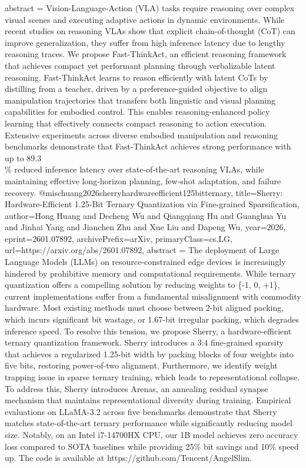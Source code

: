 {      abstract = {Vision-Language-Action (VLA) tasks require reasoning over complex visual scenes and executing adaptive actions in dynamic environments. While recent studies on reasoning VLAs show that explicit chain-of-thought (CoT) can improve generalization, they suffer from high inference latency due to lengthy reasoning traces. We propose Fast-ThinkAct, an efficient reasoning framework that achieves compact yet performant planning through verbalizable latent reasoning. Fast-ThinkAct learns to reason efficiently with latent CoTs by distilling from a teacher, driven by a preference-guided objective to align manipulation trajectories that transfers both linguistic and visual planning capabilities for embodied control. This enables reasoning-enhanced policy learning that effectively connects compact reasoning to action execution. Extensive experiments across diverse embodied manipulation and reasoning benchmarks demonstrate that Fast-ThinkAct achieves strong performance with up to 89.3\\\% reduced inference latency over state-of-the-art reasoning VLAs, while maintaining effective long-horizon planning, few-shot adaptation, and failure recovery.}
}@misc{huang2026sherryhardwareefficient125bitternary,
      title={Sherry: Hardware-Efficient 1.25-Bit Ternary Quantization via Fine-grained Sparsification}, 
      author={Hong Huang and Decheng Wu and Qiangqiang Hu and Guanghua Yu and Jinhai Yang and Jianchen Zhu and Xue Liu and Dapeng Wu},
      year={2026},
      eprint={2601.07892},
      archivePrefix={arXiv},
      primaryClass={cs.LG},
      url={https://arxiv.org/abs/2601.07892},
      abstract = {The deployment of Large Language Models (LLMs) on resource-constrained edge devices is increasingly hindered by prohibitive memory and computational requirements. While ternary quantization offers a compelling solution by reducing weights to \{-1, 0, +1\}, current implementations suffer from a fundamental misalignment with commodity hardware. Most existing methods must choose between 2-bit aligned packing, which incurs significant bit wastage, or 1.67-bit irregular packing, which degrades inference speed. To resolve this tension, we propose Sherry, a hardware-efficient ternary quantization framework. Sherry introduces a 3:4 fine-grained sparsity that achieves a regularized 1.25-bit width by packing blocks of four weights into five bits, restoring power-of-two alignment. Furthermore, we identify weight trapping issue in sparse ternary training, which leads to representational collapse. To address this, Sherry introduces Arenas, an annealing residual synapse mechanism that maintains representational diversity during training. Empirical evaluations on LLaMA-3.2 across five benchmarks demonstrate that Sherry matches state-of-the-art ternary performance while significantly reducing model size. Notably, on an Intel i7-14700HX CPU, our 1B model achieves zero accuracy loss compared to SOTA baselines while providing 25\% bit savings and 10\% speed up. The code is available at https://github.com/Tencent/AngelSlim.}
}
